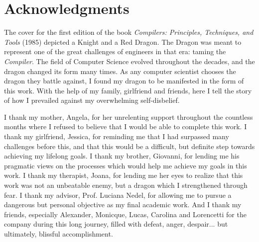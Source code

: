 \chapter*{Acknowledgments}

The cover for the first edition of the book \emph{Compilers: Principles, Techniques, and Tools} (1985) depicted a Knight and a Red Dragon. The Dragon was meant to represent one of the great challenges of engineers in that era: taming the \emph{Compiler}. The field of Computer Science evolved throughout the decades, and the dragon changed its form many times. As any computer scientist chooses the dragon they battle against, I found my dragon to be manifested in the form of this work. With the help of my family, girlfriend and friends, here I tell the story of how I prevailed against my overwhelming self-disbelief.

I thank my mother, Angela, for her unrelenting support throughout the countless months where I refused to believe that I would be able to complete this work. I thank my girlfriend, Jessica, for reminding me that I had surpassed many challenges before this, and that this would be a difficult, but definite step towards achieving my lifelong goals. I thank my brother, Giovanni, for lending me his pragmatic views on the processes which would help me achieve my goals in this work. I thank my therapist, Joana, for lending me her eyes to realize that this work was not an unbeatable enemy, but a dragon which I strengthened through fear. I thank my advisor, Prof. Luciana Nedel, for allowing me to pursue a dangerous but personal objective as my final academic work. And I thank my friends, especially Alexander, Monicque, Lucas, Carolina and Lorencetti for the company during this long journey, filled with defeat, anger, despair... but ultimately, blissful accomplishment.